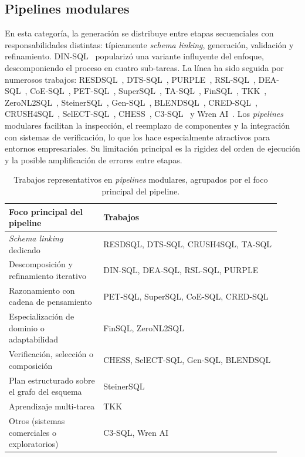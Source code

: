 \subsection{Pipelines modulares}
\label{subsec:sota-d2-pipelines}

En esta categoría, la generación se distribuye entre etapas secuenciales
con responsabilidades distintas: típicamente \emph{schema linking},
generación, validación y refinamiento. DIN-SQL~\cite{DIN-SQL2023} popularizó
una variante influyente del enfoque, descomponiendo el proceso en cuatro
sub-tareas. La línea ha sido seguida por numerosos trabajos:
RESDSQL~\cite{RESDSQL2023}, DTS-SQL~\cite{DTS-SQL2024},
PURPLE~\cite{PURPLE2024}, RSL-SQL~\cite{RSL-SQL2024},
DEA-SQL~\cite{DEA-SQL2024}, CoE-SQL~\cite{CoE-SQL2024},
PET-SQL~\cite{PET-SQL2024}, SuperSQL~\cite{SuperSQL2024},
TA-SQL~\cite{TA-SQL2024}, FinSQL~\cite{FinSQL2024},
TKK~\cite{TKK2022}, ZeroNL2SQL~\cite{ZeroNL2SQL2024},
SteinerSQL~\cite{SteinerSQL2025}, Gen-SQL~\cite{Gen-SQL2025},
BLENDSQL~\cite{BLENDSQL2025}, CRED-SQL~\cite{CRED-SQL2025},
CRUSH4SQL~\cite{CRUSH4SQL2023}, SelECT-SQL~\cite{SC-Prompt2023},
CHESS~\cite{CHESS2024}, C3-SQL~\cite{C3-SQL2023} y
Wren AI~\cite{WrenAI2025}. Los \emph{pipelines} modulares facilitan la
inspección, el reemplazo de componentes y la integración con sistemas de
verificación, lo que los hace especialmente atractivos para entornos
empresariales. Su limitación principal es la rigidez del orden de
ejecución y la posible amplificación de errores entre etapas.

\begin{table}[!htbp]
\centering
\footnotesize
\caption{Trabajos representativos en \emph{pipelines} modulares, agrupados por el foco principal del pipeline.}
\label{tab:sota-d2-pipelines}
\begin{tabular}{@{}p{0.32\linewidth}p{0.60\linewidth}@{}}
\toprule
\textbf{Foco principal del pipeline} & \textbf{Trabajos} \\
\midrule
\emph{Schema linking} dedicado & RESDSQL, DTS-SQL, CRUSH4SQL, TA-SQL \\
Descomposición y refinamiento iterativo & DIN-SQL, DEA-SQL, RSL-SQL, PURPLE \\
Razonamiento con cadena de pensamiento & PET-SQL, SuperSQL, CoE-SQL, CRED-SQL \\
Especialización de dominio o adaptabilidad & FinSQL, ZeroNL2SQL \\
Verificación, selección o composición & CHESS, SelECT-SQL, Gen-SQL, BLENDSQL \\
Plan estructurado sobre el grafo del esquema & SteinerSQL \\
Aprendizaje multi-tarea & TKK \\
Otros (sistemas comerciales o exploratorios) & C3-SQL, Wren AI \\
\bottomrule
\end{tabular}
\end{table}

